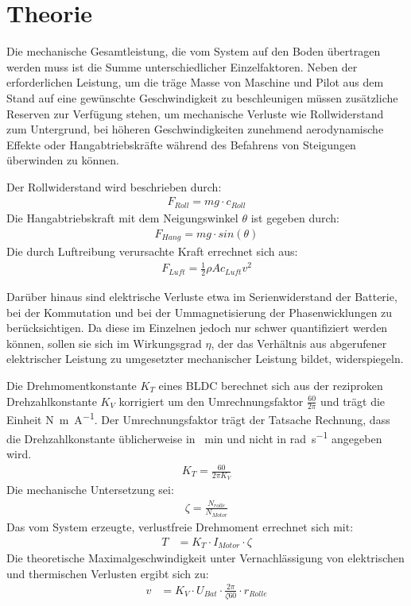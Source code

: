 \chapter{Theorie}
	Die mechanische Gesamtleistung, die vom System auf den Boden übertragen werden muss ist die Summe unterschiedlicher Einzelfaktoren.
	Neben der erforderlichen Leistung, um die träge Masse von Maschine und Pilot aus dem Stand auf eine gewünschte Geschwindigkeit zu beschleunigen müssen zusätzliche Reserven zur Verfügung stehen, um mechanische Verluste wie Rollwiderstand zum Untergrund, bei höheren Geschwindigkeiten zunehmend aerodynamische Effekte oder Hangabtriebskräfte während des Befahrens von Steigungen überwinden zu können.\par
	Der Rollwiderstand wird beschrieben durch:
	\begin{align}
		F_{Roll} = mg \cdot c_{Roll}
		\label{eq:rolling resistance}
	\end{align}
	Die Hangabtriebskraft mit dem Neigungswinkel \(\theta\) ist gegeben durch:
	\begin{align}
		F_{Hang} = mg \cdot sin\left(\theta\right)
		\label{eq:downhill force}
	\end{align}
	Die durch Luftreibung verursachte Kraft errechnet sich aus:
	\begin{align}
		F_{Luft} = \frac{1}{2}\rho A c_{Luft} v^2
		\label{eq:air drag}
	\end{align}

	Darüber hinaus sind elektrische Verluste etwa im Serienwiderstand der Batterie, bei der Kommutation und bei der Ummagnetisierung der Phasenwicklungen zu berücksichtigen.
	Da diese im Einzelnen jedoch nur schwer quantifiziert werden können, sollen sie sich im Wirkungsgrad \(\eta\), der das Verhältnis aus abgerufener elektrischer Leistung zu umgesetzter mechanischer Leistung bildet, widerspiegeln.\par\medskip
	Die Drehmomentkonstante \(K_T\) eines BLDC berechnet sich aus der reziproken Drehzahlkonstante \(K_V\) korrigiert um den Umrechnungsfaktor \(\frac{60}{2\pi}\) und trägt die Einheit \unit{\newton\metre\per\ampere}.
	Der Umrechnungsfaktor trägt der Tatsache Rechnung, dass die Drehzahlkonstante üblicherweise in \unit{\per\minute} und nicht in \unit{\radian\per\second} angegeben wird.
	\begin{align}
		K_T = \frac{60}{2\pi K_V}
		\label{eq:kv to kt}
	\end{align}
	Die mechanische Untersetzung sei:
	\begin{align}
		\zeta = \frac{N_{rolle}}{N_{Motor}}
		\label{eq:reduction}
	\end{align}
	Das vom System erzeugte, verlustfreie Drehmoment errechnet sich mit:
	\begin{align}
		T	&= K_T \cdot I_{Motor} \cdot \zeta
		\label{eq:frictionless acceleration}
	\end{align}
	Die theoretische Maximalgeschwindigkeit unter Vernachlässigung von elektrischen und thermischen Verlusten ergibt sich zu:
	\begin{align}
		v	&= K_V \cdot U_{Bat} \cdot \frac{2\pi}{\zeta 60} \cdot r_{Rolle}
		\label{eq:kv rating}
	\end{align}